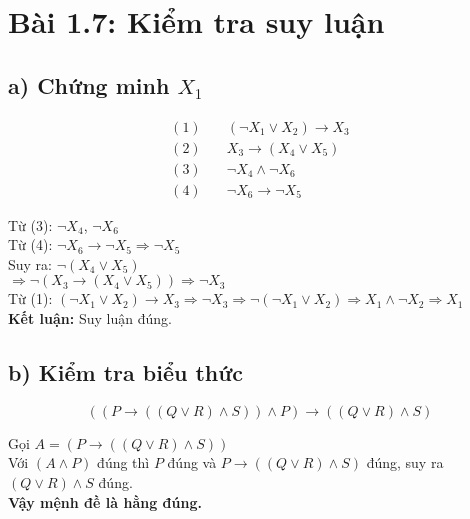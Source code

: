 \documentclass[12pt]{article}
\begin{document}
\section*{Bài 1.7: Kiểm tra suy luận}

\subsection*{a) Chứng minh $X_1$}

\begin{align*}
(1)\quad & (\neg X_1 \lor X_2) \rightarrow X_3 \\
(2)\quad & X_3 \rightarrow (X_4 \lor X_5) \\
(3)\quad & \neg X_4 \land \neg X_6 \\
(4)\quad & \neg X_6 \rightarrow \neg X_5
\end{align*}

Từ (3): $\neg X_4$, $\neg X_6$\\
Từ (4): $\neg X_6 \rightarrow \neg X_5 \Rightarrow \neg X_5$\\
Suy ra: $\neg (X_4 \lor X_5)$\\
$\Rightarrow \neg (X_3 \rightarrow (X_4 \lor X_5)) \Rightarrow \neg X_3$\\
Từ (1): $(\neg X_1 \lor X_2) \rightarrow X_3 \Rightarrow \neg X_3 \Rightarrow \neg(\neg X_1 \lor X_2) \Rightarrow X_1 \land \neg X_2 \Rightarrow X_1$\\
\textbf{Kết luận:} Suy luận đúng.

\subsection*{b) Kiểm tra biểu thức}

\[
((P \rightarrow ((Q \lor R) \land S)) \land P) \rightarrow ((Q \lor R) \land S)
\]

Gọi $A = (P \rightarrow ((Q \lor R) \land S))$\\
Với $(A \land P)$ đúng thì $P$ đúng và $P \rightarrow ((Q \lor R) \land S)$ đúng, suy ra $(Q \lor R) \land S$ đúng.\\
\textbf{Vậy mệnh đề là hằng đúng.}
\end{document}
